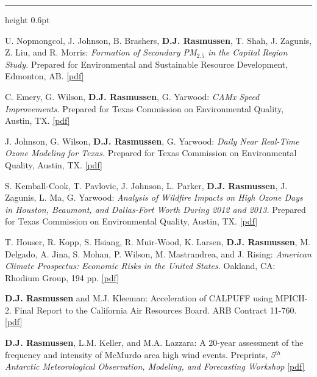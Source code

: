 \documentclass[10.5pt]{article}
\newcommand{\cvsection}[1]{%
  \par\addvspace{12pt}\pagebreak[3]%
  {\sffamily\bfseries\small\textls[80]{\MakeUppercase{#1}}}%
  \par\vspace{2pt}%
  {\color{rulegray}\hrule height 0.6pt}%
  \vspace{5pt}\nopagebreak}
\renewcommand{\section}[1]{\cvsection{#1}}
\newcommand{\yr}[1]{{\sffamily\bfseries #1}}
\begin{document}
\section{Research Reports}
\begin{entries}
\item[\yr{2015}] U. Nopmongcol, J. Johnson, B. Brashers, \textbf{D.J. Rasmussen}, T. Shah, J. Zagunis, Z. Liu, and R. Morris: \emph{Formation of Secondary PM$_{2.5}$ in the Capital Region Study.} Prepared for Environmental and Sustainable Resource Development, Edmonton, AB. \href{https://www.dropbox.com/s/6wwnkeby8yndri9/2015-FormationSecPM2.5CapitalReg-Report-2015.pdf?dl=0}{[pdf]}
\item[\yr{2015}] C. Emery, G. Wilson, \textbf{D.J. Rasmussen}, G. Yarwood: \emph{CAMx Speed Improvements.} Prepared for Texas Commission on Environmental Quality, Austin, TX. \href{https://wayback.archive-it.org/414/20210529064701/https://www.tceq.texas.gov/assets/public/implementation/air/am/contracts/reports/pm/5821550417FY1535-20150731-environ-camx_speed_improvement.pdf}{[pdf]}
\item[\yr{2015}] J. Johnson, G. Wilson, \textbf{D.J. Rasmussen}, G. Yarwood: \emph{Daily Near Real-Time Ozone Modeling for Texas.} Prepared for Texas Commission on Environmental Quality, Austin, TX. \href{https://www.dropbox.com/s/9ju5z2ow9c7lpko/5821110365FY1416-20150129-environ-NRT_O3_modeling_phase2.pdf?dl=0}{[pdf]}
\item[\yr{2014}] S. Kemball-Cook, T. Pavlovic, J. Johnson, L. Parker, \textbf{D.J. Rasmussen}, J. Zagunis, L. Ma, G. Yarwood: \emph{Analysis of Wildfire Impacts on High Ozone Days in Houston, Beaumont, and Dallas-Fort Worth During 2012 and 2013.} Prepared for Texas Commission on Environmental Quality, Austin, TX. \href{https://www.dropbox.com/s/kfeb4wm98wiuyca/5821110365FY1419-20140731-environ-wildfire_ozone_impact.pdf?dl=0}{[pdf]}
\item[\yr{2014}] T. Houser, R. Kopp, S. Hsiang, R. Muir-Wood, K. Larsen, \textbf{D.J. Rasmussen}, M. Delgado, A. Jina, S. Mohan, P. Wilson, M. Mastrandrea, and J. Rising: \emph{American Climate Prospectus: Economic Risks in the United States.} Oakland, CA: Rhodium Group, 194 pp. \href{https://www.dropbox.com/s/whigxyzshopcgmz/AmericanClimateProspectus_v1.2.pdf?dl=0}{[pdf]}
\item[\yr{2012}] \textbf{D.J. Rasmussen} and M.J. Kleeman: Acceleration of CALPUFF using MPICH-2. Final Report to the California Air Resources Board. ARB Contract 11-760. \href{https://www.dropbox.com/s/dti8dfaohikwkth/parallel_CALPUFF_FINALreport_CARB.pdf?dl=0}{[pdf]}
\item[\yr{2010}] \textbf{D.J. Rasmussen}, L.M. Keller, and M.A. Lazzara: A 20-year assessment of the frequency and intensity of McMurdo area high wind events. Preprints, \emph{5$^{th}$ Antarctic Meteorological Observation, Modeling, and Forecasting Workshop} \href{https://www.dropbox.com/s/zmtpe7ld9i177am/bprc_technical_report_2010-01.pdf?dl=0}{[pdf]}
\end{entries}
\end{document}
